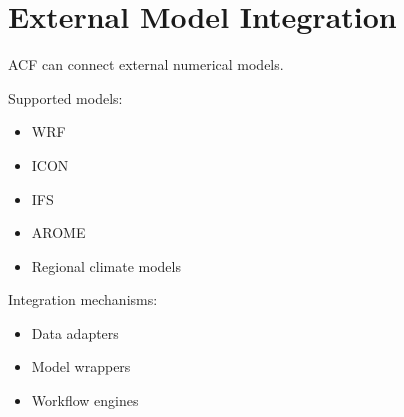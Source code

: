 \section{External Model Integration}


ACF can connect external numerical models.



Supported models:


\begin{itemize}

\item WRF

\item ICON

\item IFS

\item AROME

\item Regional climate models

\end{itemize}



Integration mechanisms:


\begin{itemize}

\item Data adapters

\item Model wrappers

\item Workflow engines

\end{itemize}
